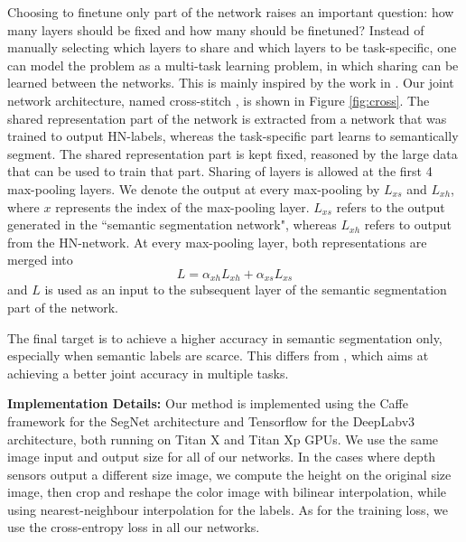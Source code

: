 Choosing to finetune only part of the network raises an important question: how many layers should be fixed and how many should be finetuned? Instead of manually selecting which layers to share and which layers to be task-specific, one can model the problem as a multi-task learning problem, in which sharing can be learned between the networks. This is mainly inspired by the work in \cite{misra2016cross}. Our joint network architecture, named cross-stitch \cite{misra2016cross}, is shown in Figure \ref{fig:cross}. The shared representation part of the network is extracted from a network that was trained to output HN-labels, whereas the task-specific part learns to semantically segment. The shared representation part is kept fixed, reasoned by the large data that can be used to train that part. Sharing of layers is allowed at the first 4 max-pooling layers. We denote the output at every max-pooling by $L_{xs}$ and $L_{xh}$, where $x$ represents the index of the max-pooling layer. $L_{xs}$ refers to the output generated in the ``semantic segmentation network", whereas $L_{xh}$ refers to output from the HN-network. At every max-pooling layer, both representations are merged into $$L = \alpha_{xh}L_{xh} + \alpha_{xs}L_{xs}$$ and $L$ is used as an input to the subsequent layer of the semantic segmentation part of the network.

The final target is to achieve a higher accuracy in semantic segmentation only, especially when semantic labels are scarce. This differs from \cite{misra2016cross}, which aims at achieving a better joint accuracy in multiple tasks.


\noindent \textbf{Implementation Details: } Our method is implemented using the Caffe framework \cite{jia2014caffe} for the SegNet architecture and Tensorflow \cite{abadi2016tensorflow} for the DeepLabv3 architecture, both running on Titan X and Titan Xp GPUs. We use the same image input and output size for all of our networks. In the cases where depth sensors output a different size image, we compute the height on the original size image, then crop and reshape the color image with bilinear interpolation, while using nearest-neighbour interpolation for the labels. As for the training loss, we use the cross-entropy loss \cite{long2015fully} in all our networks. 




